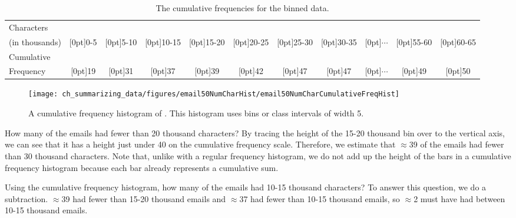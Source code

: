 \begin{table}[ht]
\centering\small
\begin{tabular}{l ccc ccc ccc c}
  \hline
Characters & \\
(in thousands) & \raisebox{1.5ex}[0pt]{0-5} & \raisebox{1.5ex}[0pt]{5-10} & \raisebox{1.5ex}[0pt]{10-15} & \raisebox{1.5ex}[0pt]{15-20} & \raisebox{1.5ex}[0pt]{20-25} & \raisebox{1.5ex}[0pt]{25-30} &  \raisebox{1.5ex}[0pt]{30-35} &\raisebox{1.5ex}[0pt]{$\cdots$} & \raisebox{1.5ex}[0pt]{55-60} & \raisebox{1.5ex}[0pt]{60-65} \\
  \hline
Cumulative &\\
Frequency &  \raisebox{1.5ex}[0pt]{19} & \raisebox{1.5ex}[0pt]{31} & \raisebox{1.5ex}[0pt]{37} & \raisebox{1.5ex}[0pt]{39} & \raisebox{1.5ex}[0pt]{42} & \raisebox{1.5ex}[0pt]{47} & \raisebox{1.5ex}[0pt]{47} & \raisebox{1.5ex}[0pt]{$\cdots$} & \raisebox{1.5ex}[0pt]{49} & \raisebox{1.5ex}[0pt]{50} \\
  \hline
\end{tabular}
\caption{The cumulative frequencies for the binned  data.}
\label{binnedNumCharTableCumulative}
\end{table}

\begin{figure}[bth]
   \centering
   \texttt{[image: ch\_summarizing\_data/figures/email50NumCharHist/email50NumCharCumulativeFreqHist]}
   \caption{A cumulative frequency histogram of . This histogram uses bins or class intervals of width 5.}
   \label{email50NumCharCumulativeFreqHist}
\end{figure}

\begin{example}{How many of the emails had fewer than 20 thousand characters?}
By tracing the height of the 15-20 thousand bin over to the vertical axis, we can see that it has a height just under 40 on the cumulative frequency scale. Therefore, we estimate that $\approx$39 of the emails had fewer than 30 thousand characters. Note that, unlike with a regular frequency histogram, we do not add up the height of the bars in a cumulative frequency histogram because each bar already represents a cumulative sum.
\end{example}

\begin{example}{Using the cumulative frequency histogram, how many of the emails had 10-15 thousand characters?}
To answer this question, we do a subtraction. $\approx$39 had fewer than 15-20 thousand emails and $\approx$37 had fewer than 10-15 thousand emails, so $\approx$2 must have had between 10-15 thousand emails.
\end{example}

